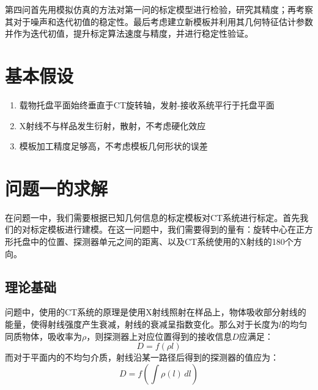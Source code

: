 \documentclass{myart}
\begin{document}
第四问首先用模拟仿真的方法对第一问的标定模型进行检验，研究其精度；再考察其对于噪声和迭代初值的稳定性。最后考虑建立新模板并利用其几何特征估计参数并作为迭代初值，提升标定算法速度与精度，并进行稳定性验证。

\section{基本假设}
\begin{enumerate}
\item 载物托盘平面始终垂直于CT旋转轴，发射-接收系统平行于托盘平面
\item X射线不与样品发生衍射，散射，不考虑硬化效应
\item 模板加工精度足够高，不考虑模板几何形状的误差
\end{enumerate}



\section{问题一的求解} 
在问题一中，我们需要根据已知几何信息的标定模板对CT系统进行标定。首先我们的对标定模板进行建模。在这一问题中，我们需要得到的量有：旋转中心在正方形托盘中的位置、探测器单元之间的距离、以及CT系统使用的X射线的180个方向。

\subsection{理论基础}
问题中，使用的CT系统的原理是使用X射线照射在样品上，物体吸收部分射线的能量，使得射线强度产生衰减，射线的衰减呈指数变化。\cite{ct1}那么对于长度为\(l\)的均匀同质物体，吸收率为\(\rho\)，则探测器上对应位置得到的接收信息\(D\)应满足：
\begin{equation}\label{dfl}
D = f(\rho l)
\end{equation}
而对于平面内的不均匀介质，射线沿某一路径后得到的探测器的值应为：
\begin{equation}
D = f(\int\rho(l)\,d l)
\end{equation}
\end{document}
